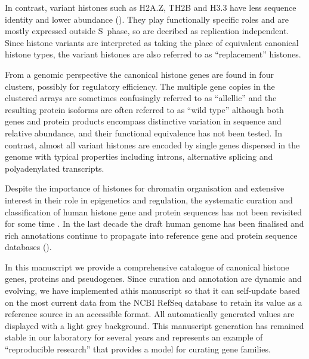   In contrast, variant histones such as H2A.Z, TH2B and H3.3 have 
  less sequence identity and lower abundance (). 
  They play functionally specific roles and are mostly expressed outside S~phase, 
  so are decribed as replication independent. 
  Since histone variants are interpreted as taking the place of equivalent canonical histone types, 
  the variant histones are also referred to as ``replacement'' histones.
  
  From a genomic perspective the canonical histone genes are found in four clusters, possibly for regulatory efficiency. 
  The multiple gene copies in the clustered arrays are sometimes confusingly referred to as ``allellic'' 
  and the resulting protein isoforms are often referred to as ``wild type'' 
  although both genes and protein products encompass distinctive variation in sequence and relative abundance, 
  and their functional equivalence has not been tested.
  In contrast, almost all variant histones are encoded by single genes dispersed in the genome 
  with typical properties including introns, alternative splicing and polyadenylated transcripts.
  
  Despite the importance of histones for chromatin organisation and extensive interest
  in their role in epigenetics and regulation, the systematic curation and classification of human histone
  gene and protein sequences has not been revisited for some time \citep{Marzluff02}.
  In the last decade the draft human genome has been finalised 
  and rich annotations continue to propagate into reference gene and protein sequence databases ().

  In this manuscript we provide a comprehensive catalogue
  of canonical histone genes, proteins and pseudogenes. 
  Since curation and annotation are dynamic and evolving, 
  we have implemented athis manuscript so that it
  can self-update based on the most current data from the NCBI RefSeq database 
  to retain its value as a reference source in an accessible format.
  All automatically generated values are displayed with a light grey background.
  This manuscript generation has remained stable in our laboratory for several years
  and represents an example of ``reproducible research'' \citep{Claerbout2000}
  that provides a model for curating gene families.


